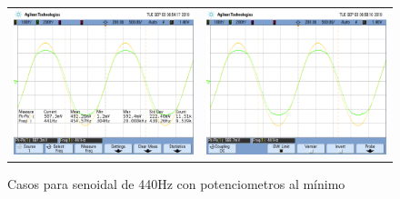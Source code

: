 \begin{figure}[H]
\begin{tabular}{c c}
        \includegraphics[scale=0.2]{../EJ5/Mediciones/Osciloscopio/Senoide_440_Minimo/scope_0.png} &
        \includegraphics[scale=0.2]{../EJ5/Mediciones/Osciloscopio/Senoide_440_Minimo/scope_3.png} 
    \end{tabular}
    \caption{Casos para senoidal de 440Hz con potenciometros al m\'inimo}
    \label{fig:senoide_440_minimo}
\end{figure}

